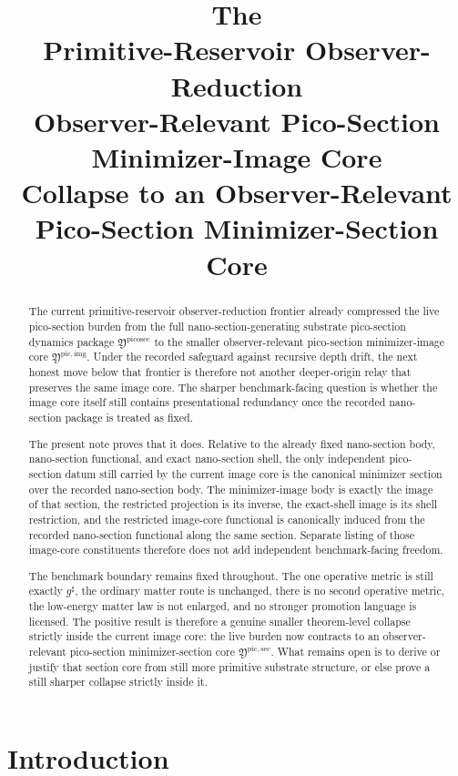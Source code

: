 \documentclass[11pt]{article}
\title{\textbf{The \TheoryName{}}\\[0.4em]
\large Primitive-Reservoir Observer-Reduction\\
\large Observer-Relevant Pico-Section Minimizer-Image Core\\
\large Collapse to an Observer-Relevant Pico-Section Minimizer-Section Core}
\author{}
\date{}
\newcommand{\CompletedMetric}{g^{\sharp}}
\newcommand{\PicoSectionPackage}{\mathfrak Y^{\mathrm{picosec}}}
\newcommand{\PicoImageCore}{\mathfrak Y^{\mathrm{pic,img}}}
\newcommand{\PicoMinSectionCore}{\mathfrak Y^{\mathrm{pic,sec}}}
\begin{document}
\maketitle

\begin{abstract}
The current primitive-reservoir observer-reduction frontier already compressed the live pico-section burden from the full nano-section-generating substrate pico-section dynamics package \(\PicoSectionPackage\) to the smaller observer-relevant pico-section minimizer-image core \(\PicoImageCore\). Under the recorded safeguard against recursive depth drift, the next honest move below that frontier is therefore not another deeper-origin relay that preserves the same image core. The sharper benchmark-facing question is whether the image core itself still contains presentational redundancy once the recorded nano-section package is treated as fixed.

The present note proves that it does. Relative to the already fixed nano-section body, nano-section functional, and exact nano-section shell, the only independent pico-section datum still carried by the current image core is the canonical minimizer section over the recorded nano-section body. The minimizer-image body is exactly the image of that section, the restricted projection is its inverse, the exact-shell image is its shell restriction, and the restricted image-core functional is canonically induced from the recorded nano-section functional along the same section. Separate listing of those image-core constituents therefore does not add independent benchmark-facing freedom.

The benchmark boundary remains fixed throughout. The one operative metric is still exactly \(\CompletedMetric\), the ordinary matter route is unchanged, there is no second operative metric, the low-energy matter law is not enlarged, and no stronger promotion language is licensed. The positive result is therefore a genuine smaller theorem-level collapse strictly inside the current image core: the live burden now contracts to an observer-relevant pico-section minimizer-section core \(\PicoMinSectionCore\). What remains open is to derive or justify that section core from still more primitive substrate structure, or else prove a still sharper collapse strictly inside it.
\end{abstract}

\section{Introduction}
\end{document}
